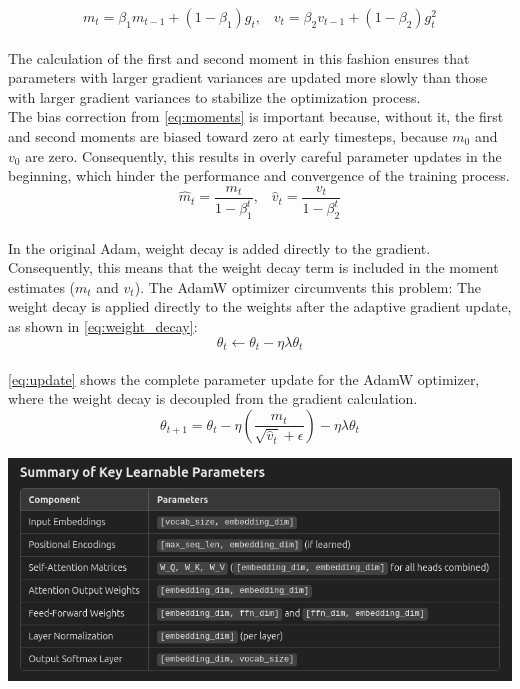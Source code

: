 \documentclass{article}
\begin{document}
\begin{equation}
\label{eq:mean_var}
m_t = \beta_1 m_{t-1} + (1 - \beta_1) g_t \text{,} \quad v_t = \beta_2 v_{t-1} + (1 - \beta_2) g_t^2
\end{equation}
\\
The calculation of the first and second moment in this fashion ensures that parameters with larger gradient variances are updated more slowly than those with larger gradient variances to stabilize the optimization process. \\
The bias correction from \cref{eq:moments} is important because, without it, the first and second moments are biased toward zero at early timesteps, because \(m_0\) and \(v_0\) are zero. Consequently, this results in overly careful parameter updates in the beginning, which hinder the performance and convergence of the training process. \\
\begin{equation}
\hat{m}_t = \frac{m_t}{1 - \beta_1^t} \text{,} \quad \hat{v}_t = \frac{v_t}{1 - \beta_2^t}
\label{eq:moments}
\end{equation}
\\
In the original Adam, weight decay is added directly to the gradient. Consequently, this means that the weight decay term is included in the moment estimates (\(m_t\) and \(v_t\)). The AdamW optimizer circumvents this problem: The weight decay is applied directly to the weights after the adaptive gradient update, as shown in \cref{eq:weight_decay}:
\begin{equation}
\label{eq:weight_decay}
\theta_t \leftarrow \theta_t - \eta \lambda \theta_t
\end{equation}
\\
\cref{eq:update} shows the complete parameter update for the AdamW optimizer, where the weight decay is decoupled from the gradient calculation.
\begin{equation}
\label{eq:update}
\theta_{t+1} = \theta_t - \eta \left( \frac{\hat{m}_t}{\sqrt{\hat{v}_t} + \epsilon} \right) - \eta \lambda \theta_t
\end{equation}

\clearpage


\clearpage

\includegraphics[width=\textwidth]{figures/learnable_params.png}


\clearpage

\end{document}
